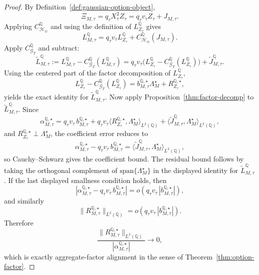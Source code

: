 \documentclass[11pt,a4paper]{amsart}
\theoremstyle{plain}
\theoremstyle{definition}
\theoremstyle{remark}
\newcommand{\QQ}{\mathbb{Q}}
\newcommand{\cG}{\mathcal{G}}
\newcommand{\cH}{\mathcal{H}}
\begin{document}
\begin{proof}
By Definition~\ref{def:gaussian-option-object},
\[
        \Xi_{M,\tau}
        =
        q_\tau X_\tau^2 Z_\tau
        =
        q_\tau v_\tau Z_\tau
        +
        J_{M,\tau}.
\]
Applying \(C_{\cH_\varpi}^\QQ\) and using the definition of \(L_{Z_\tau}^\QQ\) gives
\[
        L_{M,\tau}^\QQ
        =
        q_\tau v_\tau L_{Z_\tau}^\QQ
        +
        C_{\cH_\varpi}^\QQ(J_{M,\tau}).
\]
Apply \(C_{\cG_T}^\QQ\) and subtract:
\[
        \widetilde L_{M,\tau}^\QQ
        :=
        L_{M,\tau}^\QQ-C_{\cG_T}^\QQ(L_{M,\tau}^\QQ)
        =
        q_\tau v_\tau
        \bigl(L_{Z_\tau}^\QQ-C_{\cG_T}^\QQ(L_{Z_\tau}^\QQ)\bigr)
        +
        \widetilde J_{M,\tau}^\QQ.
\]
Using the centered part of the factor decomposition of \(L_{Z_\tau}^\QQ\),
\[
        L_{Z_\tau}^\QQ-C_{\cG_T}^\QQ(L_{Z_\tau}^\QQ)
        =
        b_{M,\tau}^{\QQ,\star}\Lambda_M^\star
        +
        R_{Z_\tau}^{\QQ,\star},
\]
yields the exact identity for \(\widetilde L_{M,\tau}^\QQ\).  Now apply
Proposition~\ref{thm:factor-decomp} to \(\widetilde L_{M,\tau}^\QQ\).  Since
\[
        \alpha_{M,\tau}^{\QQ,\star}
        =
        q_\tau v_\tau\,b_{M,\tau}^{\QQ,\star}
        +
        q_\tau v_\tau
        \langle R_{Z_\tau}^{\QQ,\star},\Lambda_M^\star\rangle_{L^2(\QQ)}
        +
        \langle \widetilde J_{M,\tau}^\QQ,\Lambda_M^\star\rangle_{L^2(\QQ)},
\]
and \(R_{Z_\tau}^{\QQ,\star}\perp\Lambda_M^\star\), the coefficient error reduces to
\[
        \alpha_{M,\tau}^{\QQ,\star}
        -
        q_\tau v_\tau\,b_{M,\tau}^{\QQ,\star}
        =
        \langle \widetilde J_{M,\tau}^\QQ,\Lambda_M^\star\rangle_{L^2(\QQ)},
\]
so Cauchy--Schwarz gives the coefficient bound.
The residual bound follows by taking the orthogonal complement of
\(\mathrm{span}\{\Lambda_M^\star\}\) in the displayed identity for
\(\widetilde L_{M,\tau}^\QQ\).  If the last displayed smallness condition holds, then
\[
        \left|
                \alpha_{M,\tau}^{\QQ,\star}
                -
                q_\tau v_\tau\,b_{M,\tau}^{\QQ,\star}
        \right|
        =
        o\!\left(q_\tau v_\tau\,|b_{M,\tau}^{\QQ,\star}|\right),
\]
and similarly
\[
        \|R_{M,\tau}^{\QQ,\star}\|_{L^2(\QQ)}
        =
        o\!\left(q_\tau v_\tau\,|b_{M,\tau}^{\QQ,\star}|\right).
\]
Therefore
\[
        \frac{\|R_{M,\tau}^{\QQ,\star}\|_{L^2(\QQ)}}{|\alpha_{M,\tau}^{\QQ,\star}|}
        \to0,
\]
which is exactly aggregate-factor alignment in the sense of
Theorem~\ref{thm:option-factor}.
\end{proof}
\end{document}
